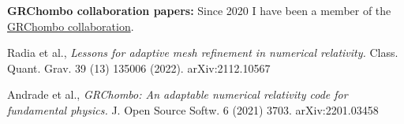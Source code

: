 \documentclass{my_cv}
\begin{document}
{\bf GRChombo collaboration papers:} Since 2020 I have been a member of the 
\href{https://www.grchombo.org/}{GRChombo collaboration}.
\begin{etaremune}
\item Radia et al., 
   \emph{Lessons for adaptive mesh refinement in numerical relativity.}
    Class. Quant. Grav. 39 (13) 135006 (2022).
    arXiv:2112.10567

\item Andrade et al.,
   \emph{GRChombo: An adaptable numerical relativity code for fundamental physics.}
   J. Open Source Softw. 6 (2021) 3703. 
   arXiv:2201.03458

\end{etaremune}
\end{document}
